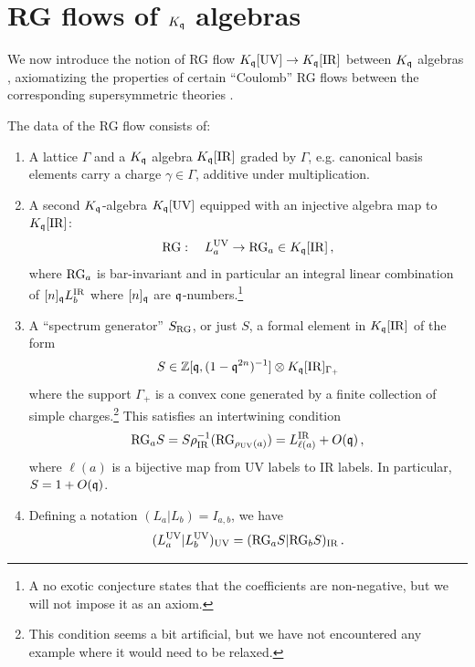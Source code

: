 \documentclass[12pt]{amsart}
\begin{document}
\section{RG flows of $K_{\mathfrak{q}}$ algebras}\label{sec:rg}
We now introduce the notion of RG flow $K_{\mathfrak{q}}[\mathrm{UV}] \to K_{\mathfrak{q}}[\mathrm{IR}]$ between $K_{\mathfrak{q}}$ algebras , axiomatizing the properties of certain ``Coulomb'' RG flows between the corresponding supersymmetric theories \cite{Ambrosino:2025qpy}. 
\begin{definition}[RG flow]
\label{def:rg}
The data of the RG flow consists of:
\begin{enumerate}[label=(R\arabic*), ref=R\arabic*, leftmargin=*, itemsep=5pt]
  \item\label{ax:lattice}
   	A lattice $\Gamma$ and a $K_{\mathfrak{q}}$ algebra $K_{\mathfrak{q}}[\mathrm{IR}]$ graded by $\Gamma$, e.g. canonical basis elements 
	carry a charge $\gamma \in \Gamma$, additive under multiplication. 
  \item\label{ax:map}
  A second $K_{\mathfrak{q}}$-algebra $K_{\mathfrak{q}}[\mathrm{UV}]$ equipped with an injective algebra map to $K_{\mathfrak{q}}[\mathrm{IR}]$:
	\begin{equation}
		\mathrm{RG}:\quad  L^{\mathrm{UV}}_a \to \mathrm{RG}_a \in K_{\mathfrak{q}}[\mathrm{IR}]\, ,
	\end{equation}
    where $\mathrm{RG}_a$ is bar-invariant and in particular an integral linear combination of $[n]_{\mathfrak{q}} L^{\mathrm{IR}}_b$ where $[n]_{\mathfrak{q}}$ are $\mathfrak{q}$-numbers.\footnote{A no exotic conjecture states that the coefficients are non-negative, but we will not impose it as an axiom.}
  \item\label{ax:S}
  A ``spectrum generator'' $S_{\mathrm{RG}}$, or just $S$, a formal element in $K_{\mathfrak{q}}[\mathrm{IR}]$ of the form
	\begin{equation}
		S \in \mathbb{Z}[\mathfrak{q},(1-\mathfrak{q}^{2n})^{-1}] \otimes K_{\mathfrak{q}}[\mathrm{IR}]_{\Gamma_+} 
	\end{equation}
where the support $\Gamma_+$ is a convex cone generated by a finite collection of simple charges.\footnote{This condition seems a bit artificial, but we have not encountered any example where it would need to be relaxed.} 
This satisfies an intertwining condition 
	\begin{equation}
		\mathrm{RG}_a S = S \rho^{-1}_{\mathrm{IR}}(\mathrm{RG}_{\rho_{\mathrm{UV}}(a)}) = L^{\mathrm{IR}}_{\ell(a)} + O(\mathfrak{q})\, ,
	\end{equation}	
	where $\ell(a)$ is a bijective map from UV labels to IR labels. In particular, $S = 1+ 	O(\mathfrak{q})$.
  \item\label{ax:rgtrace}
  Defining a notation $(L_a|L_b) = I_{a,b}$, we have
	\begin{equation}
		(L^{\mathrm{UV}}_a |L^{\mathrm{UV}}_b)_{\mathrm{UV}} = (\mathrm{RG}_a S | \mathrm{RG}_b S)_{\mathrm{IR}} \, .
	\end{equation}
\end{enumerate}
\end{definition}
\end{document}
